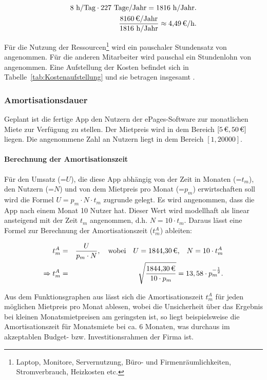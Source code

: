 \begin{eqnarray}
	8 \mbox{ h/Tag} \cdot 227 \mbox{ Tage/Jahr} = 1816 \mbox{ h/Jahr} .\\
	\frac{\eur{8160} \mbox{/Jahr}}{1816 \mbox{ h/Jahr}} \approx \eur{4,49}\mbox{/h}.
\end{eqnarray}

Für die Nutzung der Ressourcen\footnote{Laptop, Monitore, Servernutzung, Büro- und Firmenräumlichkeiten, Stromverbrauch, Heizkosten etc.} wird ein pauschaler Stundensatz von  angenommen. Für die anderen Mitarbeiter wird pauschal ein Stundenlohn von  angenommen. Eine Aufstellung der Kosten befindet sich in Tabelle~\ref{tab:Kostenaufstellung} und sie betragen insgesamt .

\subsubsection{Amortisationsdauer}
\label{sec:Amortisationsdauer}

Geplant ist die fertige App den Nutzern der ePages-Software zur monatlichen Miete zur Verfügung zu stellen. Der Mietpreis wird in dem Bereich $[\mbox{\eur{5}},\mbox{\eur{50}}]$ liegen. Die angenommene Zahl an Nutzern liegt in dem Bereich $[\mbox{1},\mbox{20000}]$.

\paragraph{Berechnung der Amortisationszeit}
Für den Umsatz (=$U$), die diese App abhängig von der Zeit in Monaten (=$t_m$), den Nutzern (=$N$) und von dem Mietpreis pro Monat (=$p_m$) erwirtschaften soll wird die Formel $U = p_m \cdot N \cdot t_m$ zugrunde gelegt. Es wird angenommen, dass die App nach einem Monat 10 Nutzer hat. Dieser Wert wird modellhaft als linear ansteigend mit der Zeit $t_m$ angenommen, d.h. $N = 10 \cdot t_m$. Daraus lässt eine Formel zur Berechnung der Amortisationszeit ($t^{A}_m$) ableiten:

\begin{eqnarray}
	t^{A}_m &=& \frac{U}{p_m \cdot N},\quad \mbox{wobei}\quad U = \mbox{\eur{1844,30},}\quad N = 10 \cdot t_m^{A}\\
	\Rightarrow t^{A}_m &=& \sqrt{\frac{\eur{1844,30}}{10 \cdot p_m}} = 13,58 \cdot p_m^{-\frac{1}{2}}.
\end{eqnarray}

Aus dem Funktionsgraphen aus  lässt sich die Amortisationszeit $t_m^{A}$ für jeden möglichen Mietpreis pro Monat ablesen, wobei die Unsicherheit über das Ergebnis bei kleinen Monatsmietpreisen am geringsten ist, so liegt beispielsweise die Amortisationszeit für  Monatsmiete bei ca. 6 Monaten, was durchaus im akzeptablen Budget- bzw. Investitionsrahmen der Firma ist.

